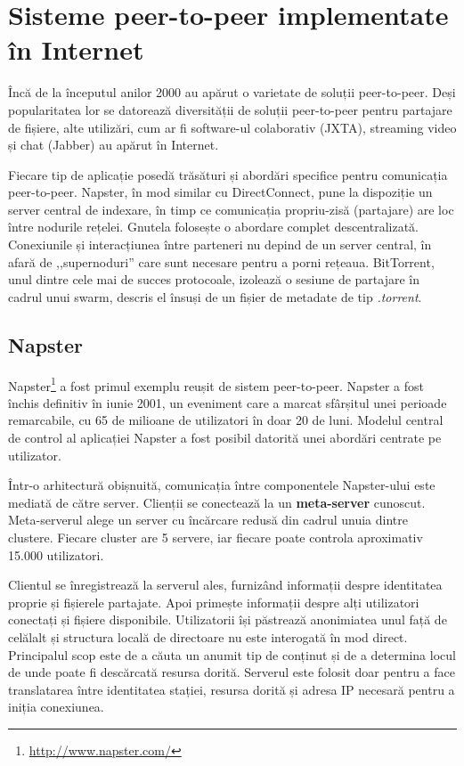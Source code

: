 \section{Sisteme peer-to-peer implementate în Internet}
\label{sec:p2p-systems:p2p-internet}

Încă de la începutul anilor 2000 au apărut o varietate de soluții peer-to-peer.
Deși popularitatea lor se datorează diversității de soluții peer-to-peer pentru
partajare de fișiere, alte utilizări, cum ar fi software-ul colaborativ
(JXTA), streaming video și chat (Jabber) au apărut în Internet.

Fiecare tip de aplicație posedă trăsături și abordări specifice pentru
comunicația peer-to-peer. Napster, în mod similar cu DirectConnect,
pune la dispoziție un server central de indexare, în timp ce comunicația
propriu-zisă (partajare) are loc între nodurile rețelei. Gnutela folosește
o abordare complet descentralizată. Conexiunile și interacțiunea
între parteneri nu depind de un server central, în afară de ,,supernoduri''
care sunt necesare pentru a porni rețeaua. BitTorrent, unul dintre cele
mai de succes protocoale, izolează o sesiune de partajare în cadrul unui
swarm, descris el însuși de un fișier de metadate de tip \textit{.torrent}.

\subsection{Napster}

Napster\footnote{\url{http://www.napster.com/}} a fost primul exemplu
reușit de sistem peer-to-peer. Napster a fost închis definitiv în iunie 2001,
un eveniment care a marcat sfârșitul unei perioade remarcabile, cu 65 de
milioane de utilizatori în doar 20 de luni. Modelul central de control
al aplicației Napster a fost posibil datorită unei abordări centrate pe
utilizator.

Într-o arhitectură obișnuită, comunicația între componentele Napster-ului
este mediată de către server. Clienții se conectează la un \textbf{meta-server}
cunoscut. Meta-serverul alege un server cu încărcare redusă din cadrul
unuia dintre clustere. Fiecare cluster are 5 servere, iar fiecare poate
controla aproximativ 15.000 utilizatori.

Clientul se înregistrează la serverul ales, furnizând informații despre
identitatea proprie și fișierele partajate. Apoi primește informații
despre alți utilizatori conectați și fișiere disponibile. Utilizatorii
își păstrează anonimiatea unul față de celălalt și structura locală de
directoare nu este interogată în mod direct. Principalul scop este de a
căuta un anumit tip de conținut și de a determina locul de unde poate
fi descărcată resursa dorită. Serverul este folosit doar pentru a face
translatarea între identitatea stației, resursa dorită și adresa
IP necesară pentru a iniția conexiunea.

